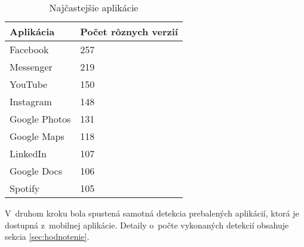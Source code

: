 \begin{table}[htb]
\centering
\begin{tabular}{|l|l|}
\hline
Aplikácia     & Počet rôznych verzií \\ \hline
Facebook      & 257                  \\
Messenger     & 219                  \\
YouTube       & 150                   \\
Instagram     & 148                  \\
Google Photos & 131                   \\
Google Maps   & 118                   \\
LinkedIn      & 107                   \\
Google Docs   & 106                   \\ 
Spotify       & 105                   \\ \hline
\end{tabular}
\caption{Najčastejšie aplikácie}
\label{apps-common}
\end{table}

V~druhom kroku bola spustená samotná detekcia prebalených aplikácií, ktorá je dostupná z~mobilnej aplikácie. Detaily o~počte vykonaných detekcií obsahuje sekcia \ref{sec:hodnotenie}.
